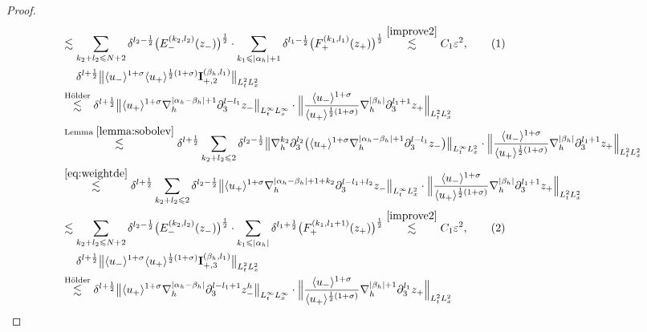 \documentclass[10pt,reqno]{amsart}
\numberwithin{equation}{section}
\begin{document}
\begin{proof}
\begin{align*}
&\lesssim \sum_{k_2+l_2\leqslant N+2}\delta^{l_2-\frac{1}{2}}\big(E_-^{(k_2,l_2)}(z_-)\big)^{\frac{1}{2}}\cdot\sum_{k_1\leqslant|\alpha_h|+1}\delta^{l_1-\frac{1}{2}}\big(F_+^{(k_1,l_1)}(z_+)\big)^{\frac{1}{2}}
\stackrel{\eqref{improve2}}{\lesssim} C_1\varepsilon^2,\stepcounter{equation}\tag{\theequation}\label{eqA8}\\
&\ \ \ \ \delta^{l+\frac{1}{2}}\big\|\langle u_-\rangle^{1+\sigma}\langle u_+\rangle^{\frac{1}{2}(1+\sigma)}\mathbf{I}_{+,2}^{(\beta_h,l_1)}\big\|_{L^2_tL^2_x}\\
&\stackrel{\text{H\"older}}{\lesssim} \delta^{l+\frac{1}{2}}\big\|\langle u_+\rangle^{1+\sigma}\nabla_h^{|\alpha_h-\beta_h|+1}\partial_3^{l-l_1}z_-\big\|_{L^\infty_tL^\infty_x}\cdot  \Big\|\frac{\langle u_-\rangle^{1+\sigma}}{\langle u_+\rangle^{\frac{1}{2}(1+\sigma)}}\nabla_h^{|\beta_h|}\partial_3^{l_1+1}z_+\Big\|_{L^2_tL^2_x}\\
&\stackrel{\text{Lemma } \ref{lemma:sobolev}}{\lesssim}\delta^{l+\frac{1}{2}}
\sum_{k_2+l_2\leqslant 2}\delta^{l_2-\frac{1}{2}}\big\|\nabla_h^{k_2}\partial_3^{l_2}\big(\langle u_+\rangle^{1+\sigma}\nabla_h^{|\alpha_h-\beta_h|+1}\partial_3^{l-l_1}z_-\big)\big\|_{L^\infty_tL^2_x}\cdot  \Big\|\frac{\langle u_-\rangle^{1+\sigma}}{\langle u_+\rangle^{\frac{1}{2}(1+\sigma)}}\nabla_h^{|\beta_h|}\partial_3^{l_1+1}z_+\Big\|_{L^2_tL^2_x}\\
&\stackrel{\eqref{eq:weightde}}{\lesssim}\delta^{l+\frac{1}{2}}	\sum_{k_2+l_2\leqslant 2}\delta^{l_2-\frac{1}{2}}
\big\|\langle u_+\rangle^{1+\sigma}\nabla_h^{|\alpha_h-\beta_h|+1+k_2}\partial_3^{l-l_1+l_2}z_-\big\|_{L^\infty_tL^2_x}\cdot  \Big\|\frac{\langle u_-\rangle^{1+\sigma}}{\langle u_+\rangle^{\frac{1}{2}(1+\sigma)}}\nabla_h^{|\beta_h|}\partial_3^{l_1+1}z_+\Big\|_{L^2_tL^2_x}\\
&\lesssim
\sum_{k_2+l_2\leqslant N+2}\delta^{l_2-\frac{1}{2}}\big(E_-^{(k_2,l_2)}(z_-)\big)^{\frac{1}{2}}\cdot\sum_{k_1\leqslant|\alpha_h|}\delta^{l_1+\frac{1}{2}}\big(F_+^{(k_1,l_1+1)}(z_+)\big)^{\frac{1}{2}}
\stackrel{\eqref{improve2}}{\lesssim} C_1\varepsilon^2,\stepcounter{equation}\tag{\theequation}\label{eqA9}\\
&\ \ \ \ \delta^{l+\frac{1}{2}}\big\|\langle u_-\rangle^{1+\sigma}\langle u_+\rangle^{\frac{1}{2}(1+\sigma)}\mathbf{I}_{+,3}^{(\beta_h,l_1)}\big\|_{L^2_tL^2_x}\\
&\stackrel{\text{H\"older}}{\lesssim} \delta^{l+\frac{1}{2}}\big\|\langle u_+\rangle^{1+\sigma}\nabla_h^{|\alpha_h-\beta_h|}\partial_3^{l-l_1+1}z_-^h\big\|_{L^\infty_tL^\infty_x}\cdot \Big\|\frac{\langle u_-\rangle^{1+\sigma}}{\langle u_+\rangle^{\frac{1}{2}(1+\sigma)}}\nabla_h^{|\beta_h|+1}\partial_3^{l_1}z_+\Big\|_{L^2_tL^2_x}\\

\end{align*}
\end{proof}
\end{document}
